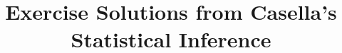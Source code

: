 \documentclass[openany]{book}
\begin{document}
\title{Exercise Solutions from Casella's Statistical Inference}

\tableofcontents



% 
% 
% 
% 
% 
% 
% 
% 
% 
% 
% 
% 
% 
% 
\end{document}
